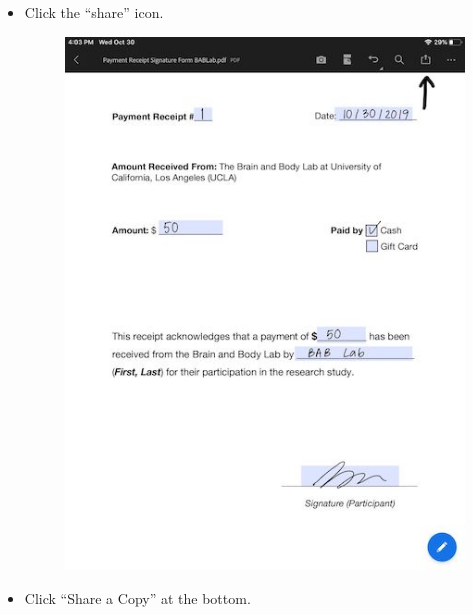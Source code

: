 \documentclass[]{book}
\begin{document}
\begin{itemize}
\item
  Click the ``share'' icon.

  \begin{figure}
  \centering
  \includegraphics{images/payment/7.jpeg}
  \caption{}
  \end{figure}
\item
  Click ``Share a Copy'' at the bottom.


\end{itemize}
\end{document}
